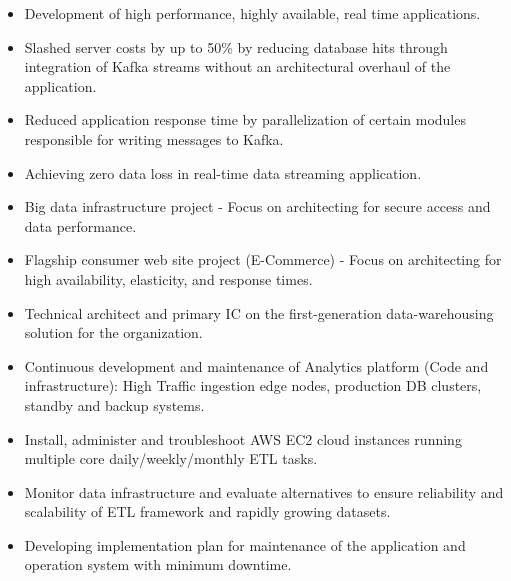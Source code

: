 \documentclass[10pt,a4paper,ragged2e]{altacv}
\begin{document}
\vspace{10px}

\begin{itemize}
    \item Development of high performance, highly available, real time applications.
    \item Slashed server costs by up to 50\% by reducing database hits through integration of Kafka streams without an architectural overhaul of the application. 
    \item Reduced application response time by parallelization of certain modules responsible for writing messages to Kafka.
    \item Achieving zero data loss in real-time data streaming application. 
\end{itemize}

\vspace{10px}


\begin{itemize}
    \item Big data infrastructure project - Focus on architecting for secure access and data performance.
    \item Flagship consumer web site project (E-Commerce) - Focus on architecting for high availability, elasticity, and response times.
    \item Technical architect and primary IC on the first-generation data-warehousing solution for the organization.
    \item Continuous development and maintenance of Analytics platform (Code and infrastructure): High Traffic ingestion edge nodes, production DB clusters, standby and backup systems.
    \item Install, administer and troubleshoot AWS EC2 cloud instances running multiple core daily/weekly/monthly ETL tasks.
    \item Monitor data infrastructure and evaluate alternatives to ensure reliability and scalability of ETL framework and rapidly growing datasets.
    \item Developing implementation plan for maintenance of the application and operation system with minimum downtime.
\end{itemize}
\end{document}
